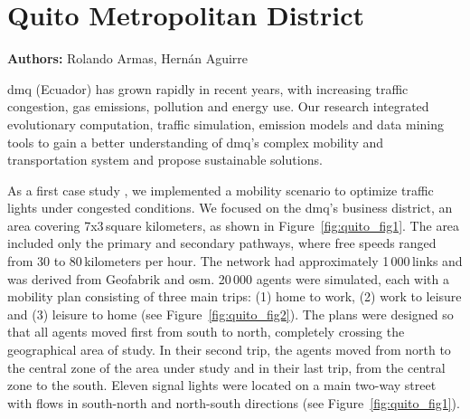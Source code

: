 \section{Quito Metropolitan District}
\label{sec:quito}
\hfill \textbf{Authors:} Rolando Armas, Hernán Aguirre



\gls{dmq} (Ecuador) has grown rapidly in recent years, with increasing traffic congestion, gas emissions, pollution and energy use. Our research integrated evolutionary computation, traffic simulation, emission models and data mining tools to gain a better understanding of \gls{dmq}’s complex mobility and transportation system and propose sustainable solutions.

As a first case study \citep[][]{ArmasEtAl_SEAL_2014}, we implemented a mobility scenario to optimize traffic lights under congested conditions. We focused on the
\gls{dmq}’s business district, an area covering 7x3\,square kilometers, as shown in Figure~\ref{fig:quito_fig1}. The area included only the primary and secondary pathways, where free speeds ranged from 30 to 80\,kilometers per hour. The network had approximately 1\,000\,links and was derived from Geofabrik and \gls{osm}. 20\,000 agents were simulated, each with a mobility plan consisting of three main trips: (1) home to work, (2) work to leisure and (3) leisure to home (see Figure~\ref{fig:quito_fig2}). The plans were designed so that all agents moved first from south to north, completely crossing the geographical area of study. In their second trip, the agents moved from north to the central zone of the area under study and in their last trip, from the central zone to the south. Eleven signal lights were located on a main two-way street with flows in south-north and north-south directions (see Figure~\ref{fig:quito_fig1}).

